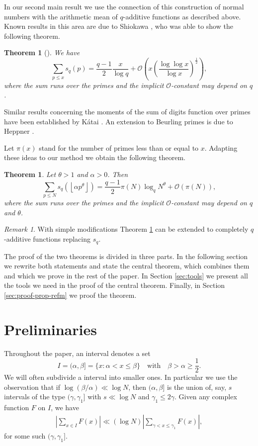 \documentclass[a4paper,10pt]{amsart}
\newtheorem{thm}[lem]{Theorem}
\numberwithin{equation}{section}
\newtheorem*{thm*}{Theorem}
\theoremstyle{definition}
\theoremstyle{remark}
\newtheorem{rem}[lem]{Remark}
\newcommand{\lf}{\left\lfloor}
\newcommand{\rf}{\right\rfloor}
\renewcommand{\lvert}{\left\vert}
\renewcommand{\rvert}{\right\vert}
\begin{document}
In our second main result we use the connection of this construction of normal
numbers with the arithmetic mean of $q$-additive functions as described above. Known
results in this area are due to Shiokawa \cite{shiokawa1974:sum_digits_prime},
who was able to show the following theorem.
\begin{thm*}[{\cite[Theorem]{shiokawa1974:sum_digits_prime}}]
We have
\[
\sum_{p\leq x}s_q(p)=\frac{q-1}2\frac x{\log
  q}+\mathcal{O}\left(x\left(\frac{\log\log x}{\log x}\right)^{\frac12}\right),
\]
where the sum runs over the primes and the implicit $\mathcal{O}$-constant may
depend on $q$.
\end{thm*}

Similar results concerning the moments of the sum of digits function over
primes have been established by K\'atai \cite{katai1977:sum_digits_primes}. An
extension to Beurling primes is due to Heppner
\cite{heppner1976:uber_die_summe}. 

Let $\pi(x)$ stand for the number of primes less than or equal to
$x$. Adapting these ideas to our method we obtain the following theorem.
\begin{thm}\label{thm:summatoryfun}
Let $\theta>1$ and $\alpha>0$. Then
\[
\sum_{p\leq N}s_q(\lf\alpha p^\theta\rf)=\frac{q-1}2\pi(N)\log_qN^\theta+\mathcal{O}(\pi(N)),
\]
where the sum runs over the primes and the implicit $\mathcal{O}$-constant may
depend on $q$ and $\theta$.
\end{thm}

\begin{rem}
With simple modifications Theorem \ref{thm:summatoryfun} can be extended to
completely $q$-additive functions replacing $s_q$.
\end{rem}

The proof of the two theorems is divided in three parts. In the following
section we  rewrite both statements and state the central theorem, which
combines them and which we  prove in the rest of the paper. In Section
\ref{sec:tools} we  present all the tools we  need in the proof of the
central theorem. Finally, in Section \ref{sec:proof-prop-refm} we  proof
the theorem.

\section{Preliminaries}\label{sec:preliminaries}
Throughout the paper, an interval denotes a set
\[
  I=(\alpha,\beta]=\{x:\alpha<x\leq\beta\}
  \quad\text{with}\quad\beta>\alpha\geq\frac12.
\]
We will often subdivide a interval into smaller ones. In particular we
use the observation that if $\log(\beta/\alpha)\ll\log N$, then
$(\alpha,\beta]$ is the union of, say, $s$ intervals of the type
$(\gamma,\gamma_1]$ with $s\ll\log N$ and $\gamma_1\leq2\gamma$. Given any
complex function $F$ on $I$, we have
\begin{gather}\label{bak:intervalsplit}
\lvert\sum_{x\in I}F(x)\rvert\ll(\log
N)\lvert\sum_{\gamma<x\leq\gamma_1}F(x)\rvert,  
\end{gather}
for some such $(\gamma,\gamma_1]$.
\end{document}
